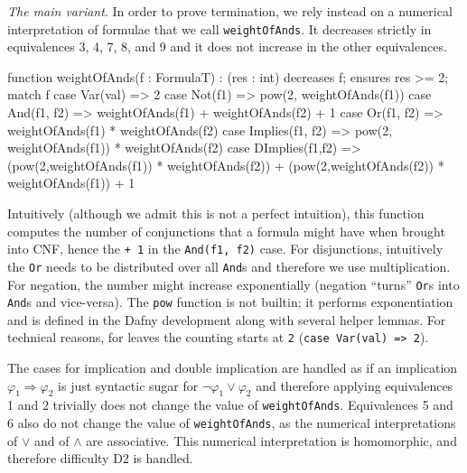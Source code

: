 \documentclass[12pt]{report}
\begin{document}
\emph{The main variant}. In order to prove termination, we rely
instead on a numerical interpretation of formulae that we call
\texttt{weightOfAnds}. It decreases strictly in equivalences 3, 4, 7,
8, and 9 and it does not increase in the other equivalences.

\begin{dafny}
function weightOfAnds(f : FormulaT) : (res : int)
  decreases f; ensures res >= 2;
{ match f {
    case Var(val)        => 2
    case Not(f1)         => pow(2, weightOfAnds(f1))
    case And(f1, f2)     => weightOfAnds(f1) + weightOfAnds(f2) + 1
    case Or(f1, f2)      => weightOfAnds(f1) * weightOfAnds(f2)
    case Implies(f1, f2) => pow(2, weightOfAnds(f1)) * weightOfAnds(f2)
    case DImplies(f1,f2) => (pow(2,weightOfAnds(f1)) * weightOfAnds(f2)) +
                    (pow(2,weightOfAnds(f2)) * weightOfAnds(f1)) + 1 } }
\end{dafny}

Intuitively (although we admit this is not a perfect intuition), this
function computes the number of conjunctions that a formula might have
when brought into CNF, hence the \texttt{+ 1} in the \texttt{And(f1,
  f2)} case. For disjunctions, intuitively the \texttt{Or} needs to be
distributed over all \texttt{And}s and therefore we use
multiplication. For negation, the number might increase exponentially
(negation ``turns'' \texttt{Or}s into \texttt{And}s and
vice-versa). The \texttt{pow} function is not builtin; it performs
exponentiation and is defined in the Dafny development along with
several helper lemmas.  For technical reasons, for leaves the counting
starts at \texttt{2} (\texttt{case Var(val) => 2}).

The cases for implication and double implication are handled as if an
implication \( \varphi_1 \Rightarrow \varphi_2 \) is just syntactic
sugar for \( \lnot \varphi_1 \lor \varphi_2 \) and therefore applying
equivalences 1 and 2 trivially does not change the value of
\texttt{weightOfAnds}. Equivalences 5 and 6 also do not change the
value of \texttt{weightOfAnds}, as the numerical interpretations of
\( \lor \) and of \( \land \) are associative. This numerical
interpretation is homomorphic, and therefore difficulty D2 is handled.
\end{document}
